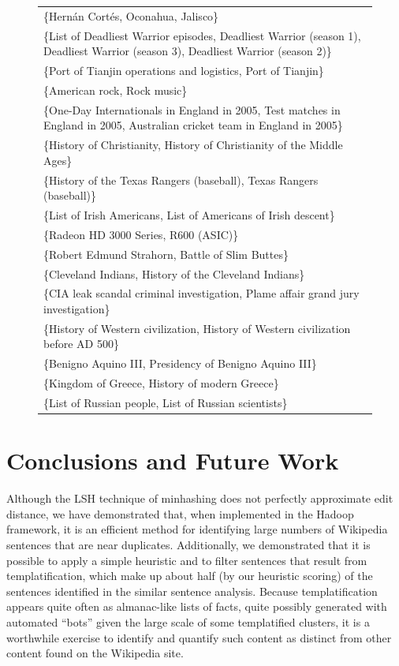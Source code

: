 \documentclass{acm_proc_article-sp}
\begin{document}
\begin{figure}[hp!]
{\begin{tabular}{| l |}
\{Hernán Cortés, Oconahua, Jalisco\} \\
\{List of Deadliest Warrior episodes, Deadliest Warrior (season 1), Deadliest Warrior (season 3), Deadliest Warrior (season 2)\} \\
\{Port of Tianjin operations and logistics, Port of Tianjin\} \\
\{American rock, Rock music\} \\
\{One-Day Internationals in England in 2005, Test matches in England in 2005, Australian cricket team in England in 2005\} \\
\{History of Christianity, History of Christianity of the Middle Ages\} \\
\{History of the Texas Rangers (baseball), Texas Rangers (baseball)\} \\
\{List of Irish Americans, List of Americans of Irish descent\} \\
\{Radeon HD 3000 Series, R600 (ASIC)\} \\
\{Robert Edmund Strahorn, Battle of Slim Buttes\} \\
\{Cleveland Indians, History of the Cleveland Indians\} \\
\{CIA leak scandal criminal investigation, Plame affair grand jury investigation\} \\
\{History of Western civilization, History of Western civilization before AD 500\} \\
\{Benigno Aquino III, Presidency of Benigno Aquino III\} \\
\{Kingdom of Greece, History of modern Greece\} \\
\{List of Russian people, List of Russian scientists\} \\
\hline
\end{tabular}
}
\label{toparticlegroups}
\end{figure}

\section{Conclusions and Future Work}

Although the LSH technique of minhashing does not perfectly approximate edit distance, we have demonstrated that, when implemented in the Hadoop framework, it is an efficient method for identifying large numbers of Wikipedia sentences that are near duplicates. Additionally, we demonstrated that it is possible to apply a simple heuristic and to filter sentences that result from templatification, which make up about half (by our heuristic scoring) of the sentences identified in the similar sentence analysis. Because templatification appears quite often as almanac-like lists of facts, quite possibly generated with automated ``bots'' given the large scale of some templatified clusters, it is a worthwhile exercise to identify and quantify such content as distinct from other content found on the Wikipedia site.
\end{document}

